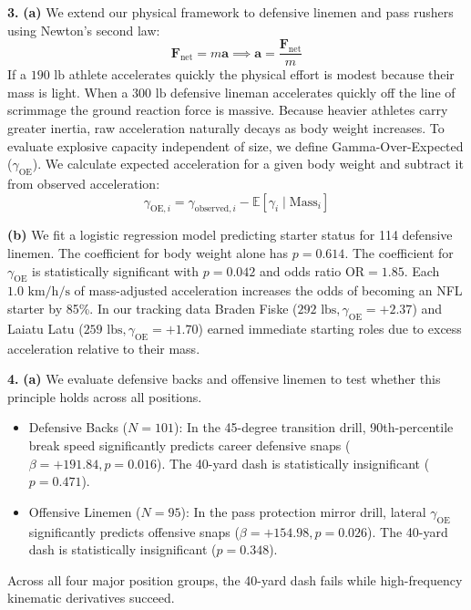 \documentclass[11pt]{article}
\begin{document}
\newpage

\noindent\textbf{3.}
\noindent\textbf{(a)}
We extend our physical framework to defensive linemen and pass rushers using Newton's second law:
\[ \mathbf{F}_{\text{net}} = m \mathbf{a} \implies \mathbf{a} = \frac{\mathbf{F}_{\text{net}}}{m} \]
If a $190\text{ lb}$ athlete accelerates quickly the physical effort is modest because their mass is light. When a $300\text{ lb}$ defensive lineman accelerates quickly off the line of scrimmage the ground reaction force is massive. Because heavier athletes carry greater inertia, raw acceleration naturally decays as body weight increases. To evaluate explosive capacity independent of size, we define Gamma-Over-Expected ($\gamma_{\text{OE}}$). We calculate expected acceleration for a given body weight and subtract it from observed acceleration:
\[ \gamma_{\text{OE}, i} = \gamma_{\text{observed}, i} - \mathbb{E}[\gamma_i \mid \text{Mass}_i] \]

\noindent\textbf{(b)}
We fit a logistic regression model predicting starter status for 114 defensive linemen. The coefficient for body weight alone has $p = 0.614$. The coefficient for $\gamma_{\text{OE}}$ is statistically significant with $p = 0.042$ and odds ratio $\text{OR} = 1.85$. Each $1.0\text{ km/h/s}$ of mass-adjusted acceleration increases the odds of becoming an NFL starter by 85\%. In our tracking data Braden Fiske ($292\text{ lbs}, \gamma_{\text{OE}} = +2.37$) and Laiatu Latu ($259\text{ lbs}, \gamma_{\text{OE}} = +1.70$) earned immediate starting roles due to excess acceleration relative to their mass.

\noindent\textbf{4.}
\noindent\textbf{(a)}
We evaluate defensive backs and offensive linemen to test whether this principle holds across all positions.
\begin{itemize}[nosep]
    \item Defensive Backs ($N=101$): In the 45-degree transition drill, 90th-percentile break speed significantly predicts career defensive snaps ($\beta = +191.84, p = 0.016$). The 40-yard dash is statistically insignificant ($p = 0.471$).
    \item Offensive Linemen ($N=95$): In the pass protection mirror drill, lateral $\gamma_{\text{OE}}$ significantly predicts offensive snaps ($\beta = +154.98, p = 0.026$). The 40-yard dash is statistically insignificant ($p = 0.348$).
\end{itemize}
Across all four major position groups, the 40-yard dash fails while high-frequency kinematic derivatives succeed.
\end{document}
